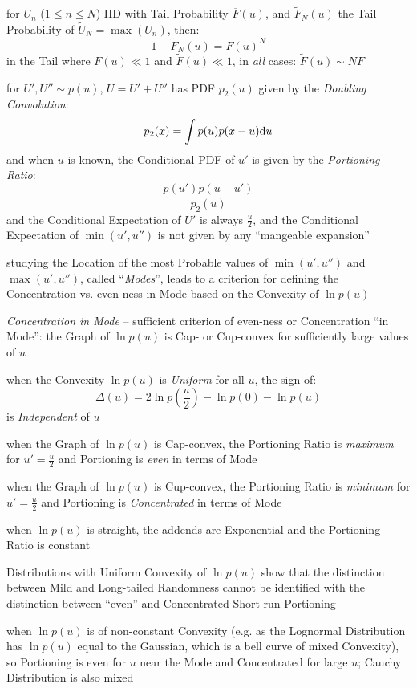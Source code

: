 for $U_n$ ($1 \leq n \leq N$) IID with Tail Probability $\overline{F}(u)$, and
$\tilde{F}_N(u)$ the Tail Probability of $\tilde{U}_N = \max(U_n)$, then:
\[
  1 - \tilde{F}_N(u) = F(u)^N
\]
in the Tail where $\overline{F}(u) \ll 1$ and $\tilde{F}(u) \ll 1$, in
\emph{all} cases: $\tilde{F}(u) \sim N \overline{F}$

for $U', U'' \sim p(u)$, $U = U' + U''$ has PDF $p_2(u)$ given by the
\emph{Doubling Convolution}:
\[
  p_2(x) = \int p(u) p(x - u) \mathrm{d}u
\]
and when $u$ is known, the Conditional PDF of $u'$ is given by the
\emph{Portioning Ratio}:
\[
  \frac{p(u') p(u - u')}{p_2(u)}
\]
and the Conditional Expectation of $U'$ is always $\frac{u}{2}$, and the
Conditional Expectation of $\min(u', u'')$ is not given by any ``mangeable
expansion''

studying the Location of the most Probable values of $\min(u', u'')$ and
$\max(u', u'')$, called ``\emph{Modes}'', leads to a criterion for defining the
Concentration vs. even-ness in Mode based on the Convexity of $\ln p(u)$

\emph{Concentration in Mode} -- sufficient criterion of even-ness or
Concentration ``in Mode'': the Graph of $\ln p(u)$ is Cap- or Cup-convex for
sufficiently large values of $u$

when the Convexity $\ln p(u)$ is \emph{Uniform} for all $u$, the sign of:
\[
  \Delta(u) = 2 \ln p(\frac{u}{2}) - \ln p(0) - \ln p(u)
\]
is \emph{Independent} of $u$

when the Graph of $\ln p(u)$ is Cap-convex, the Portioning Ratio is
\emph{maximum} for $u' = \frac{u}{2}$ and Portioning is \emph{even} in terms of
Mode

when the Graph of $\ln p(u)$ is Cup-convex, the Portioning Ratio is
\emph{minimum} for $u' = \frac{u}{2}$ and Portioning is \emph{Concentrated} in
terms of Mode

when $\ln p(u)$ is straight, the addends are Exponential and the Portioning
Ratio is constant

Distributions with Uniform Convexity of $\ln p(u)$ show that the distinction
between Mild and Long-tailed Randomness cannot be identified with the
distinction between ``even'' and Concentrated Short-run Portioning

when $\ln p(u)$ is of non-constant Convexity (e.g. as the Lognormal Distribution
has $\ln p(u)$ equal to the Gaussian, which is a bell curve of mixed Convexity),
so Portioning is even for $u$ near the Mode and Concentrated for large $u$;
Cauchy Distribution is also mixed

